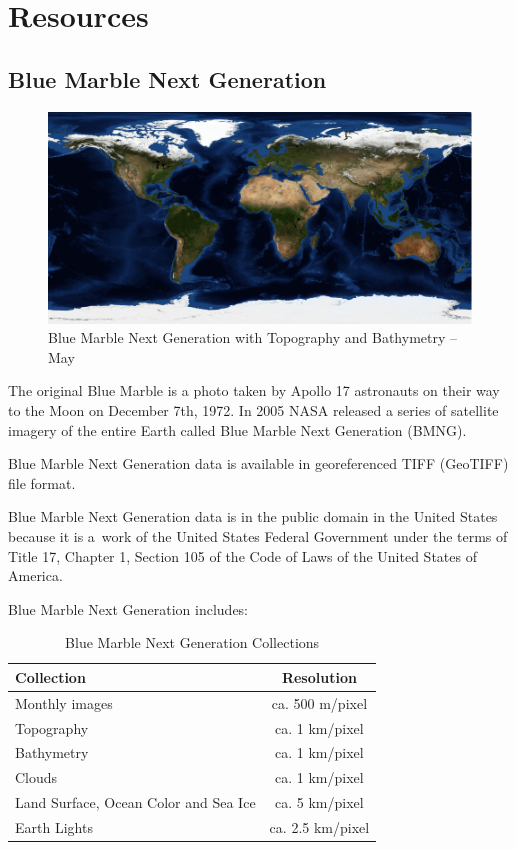 \chapter{Resources}

\section{Blue Marble Next Generation}

\begin{figure}[h!]
  \centering
  \includegraphics[width=120mm]{eps/bmng_topo_bathy_2004_05.eps}
  \caption{Blue Marble Next Generation with Topography and Bathymetry -- May}
\end{figure}

The original Blue Marble is a photo taken by Apollo 17 astronauts on their way to the Moon on December 7th, 1972. In 2005 NASA released a series of satellite imagery of the entire Earth called Blue Marble Next Generation (BMNG). \cite{Terrain-Stockli2005}

Blue Marble Next Generation data is available in georeferenced TIFF (GeoTIFF) file format.

Blue Marble Next Generation data is in the public domain in the United States because it is a work of the United States Federal Government under the terms of Title 17, Chapter 1, Section 105 of the Code of Laws of the United States of America.

Blue Marble Next Generation includes:
\begin{table}[h!]
  \begin{center}
    \begin{tabular}{ l | c }
      \toprule
      \textbf{Collection} & \textbf{Resolution} \\ \midrule
      Monthly images                        & ca. 500 m/pixel  \\
      Topography                            & ca. 1 km/pixel   \\
      Bathymetry                            & ca. 1 km/pixel   \\
      Clouds                                & ca. 1 km/pixel   \\
      Land Surface, Ocean Color and Sea Ice & ca. 5 km/pixel   \\
      Earth Lights                          & ca. 2.5 km/pixel \\
      \bottomrule
    \end{tabular}
    \caption{Blue Marble Next Generation Collections}
  \end{center}
\end{table}

